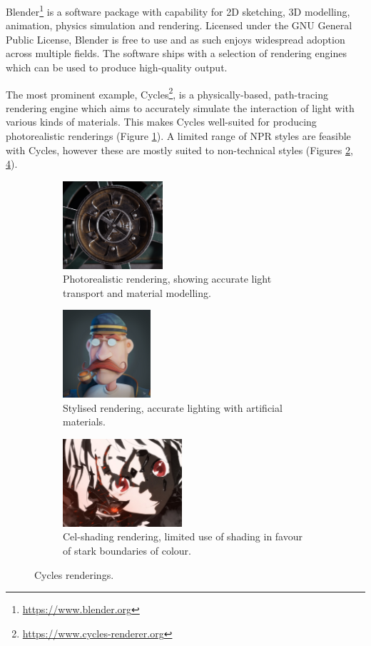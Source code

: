 Blender\footnote{\url{https://www.blender.org}} is a software package with capability for 2D sketching, 3D modelling, animation, physics simulation and rendering.
Licensed under the GNU General Public License, Blender is free to use and as such enjoys widespread adoption across multiple fields.
The software ships with a selection of rendering engines which can be used to produce high-quality output.

The most prominent example, Cycles\footnote{\url{https://www.cycles-renderer.org}}, is a physically-based, path-tracing rendering engine which aims to accurately simulate the interaction of light with various kinds of materials.
This makes Cycles well-suited for producing photorealistic renderings (Figure \ref{ex_photoreal}).
A limited range of NPR styles are feasible with Cycles, however these are mostly suited to non-technical styles (Figures \ref{ex_toon1}, \ref{ex_toon2}).

\begin{figure}[h]
	\centering
	\begin{subfigure}[b]{0.3\textwidth}
		\includegraphics[height=3.25cm]{images/ex_photoreal}
		\caption{Photorealistic rendering, showing accurate light transport and material modelling.}\label{ex_photoreal}
	\end{subfigure}
	\begin{subfigure}[b]{0.3\textwidth}
		\includegraphics[height=3.25cm]{images/ex_toon1}
		\caption{Stylised rendering, accurate lighting with artificial materials.}\label{ex_toon1}
	\end{subfigure}
	\begin{subfigure}[b]{0.3\textwidth}
		\includegraphics[height=3.25cm]{images/ex_toon2}
		\caption{Cel-shading rendering, limited use of shading in favour of stark boundaries of colour.}\label{ex_toon2}
	\end{subfigure}
	\caption{Cycles renderings.}
\end{figure}

